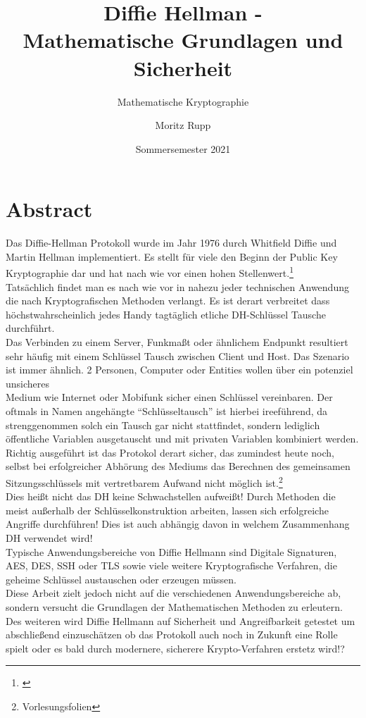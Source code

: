 \documentclass[a4paper,12pt]{scrartcl}
\title{Diffie Hellman -\\Mathematische Grundlagen und Sicherheit}
\subtitle{Mathematische Kryptographie}
\author{Moritz Rupp}
\date{Sommersemester 2021}
\begin{document}
\maketitle
\newpage
\tableofcontents
\newpage

\section{Abstract}

Das Diffie-Hellman Protokoll wurde im Jahr 1976 durch Whitfield Diffie und Martin Hellman implementiert. Es stellt für viele den Beginn der Public Key Kryptographie dar und hat nach wie vor einen hohen Stellenwert.\footnote{\cite{10.1007/978-3-540-39927-8_28}}\\ 
Tatsächlich findet man es nach wie vor in nahezu jeder technischen Anwendung die nach Kryptografischen Methoden verlangt. 
Es ist derart verbreitet dass höchstwahrscheinlich jedes Handy tagtäglich etliche DH-Schlüssel Tausche durchführt.\\
Das Verbinden zu einem Server, Funkmaßt oder ähnlichem Endpunkt resultiert sehr häufig mit einem Schlüssel Tausch zwischen Client und Host. 
Das Szenario ist immer ähnlich. 2 Personen, Computer oder Entities wollen über ein potenziel unsicheres \\Medium wie Internet oder Mobifunk sicher einen Schlüssel vereinbaren. 
Der oftmals in Namen angehängte “Schlüsseltausch” ist hierbei ireeführend, da strenggenommen solch ein Tausch gar nicht stattfindet, sondern lediglich öffentliche Variablen ausgetauscht und mit privaten Variablen kombiniert werden. \\
Richtig ausgeführt ist das Protokol derart sicher, das zumindest heute noch, selbst bei erfolgreicher Abhörung des Mediums das Berechnen des gemeinsamen Sitzungsschlüssels mit vertretbarem Aufwand nicht möglich ist.\footnote{Vorlesungsfolien}\\
Dies heißt nicht das DH keine Schwachstellen aufweißt! Durch Methoden die meist außerhalb der Schlüsselkonstruktion arbeiten, lassen sich erfolgreiche Angriffe durchführen! Dies ist auch abhängig davon in welchem Zusammenhang DH verwendet wird!\\
Typische Anwendungsbereiche von Diffie Hellmann sind Digitale Signaturen, AES, DES, SSH oder TLS sowie viele weitere Kryptografische Verfahren, die geheime Schlüssel austauschen oder erzeugen müssen.\\
Diese Arbeit zielt jedoch nicht auf die verschiedenen Anwendungsbereiche ab, sondern versucht die Grundlagen der Mathematischen Methoden zu erleutern. Des weiteren wird Diffie Hellmann auf Sicherheit und Angreifbarkeit getestet um abschließend einzuschätzen ob das Protokoll auch noch in Zukunft eine Rolle spielt oder es bald durch modernere, sicherere Krypto-Verfahren erstetz wird!?
 
\end{document}

